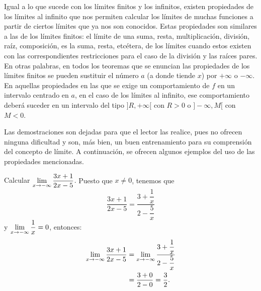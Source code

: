Igual a lo que sucede con los límites finitos y los infinitos, existen propiedades de los límites
al infinito que nos permiten calcular los límites de muchas funciones a partir de ciertos límites
que ya nos son conocidos. Estas propiedades son similares a las de los límites finitos: el límite
de una suma, resta, multiplicación, división, raíz, composición, es la suma, resta, etcétera, de
los límites cuando estos existen con las correspondientes restricciones para el caso de la división
y las raíces pares. En otras palabras, en todos los teoremas que se enuncian las propiedades de los
límites finitos se pueden sustituir el número $a$ (a donde tiende $x$) por $+\infty$ o $-\infty$.
En aquellas propiedades en las que se exige un comportamiento de $f$ en un intervalo centrado en $a$,
en el caso de los límites al infinito, ese comportamiento deberá suceder en un intervalo del tipo
$]R,+\infty[$ con $R > 0$ o $]-\infty,M[$ con $M < 0$.

Las demostraciones son dejadas para que el lector las realice, pues no ofrecen ninguna dificultad y
son, más bien, un buen entrenamiento para su comprensión del concepto de límite. A continuación, se
ofrecen algunos ejemplos del uso de las propiedades mencionadas.

\begin{exemplo}[Solución]{%
Calcular $\displaystyle\limjc{\frac{3x + 1}{2x - 5}}{x}{-\infty}$.
}%
Puesto que $x\neq 0$, tenemos que
\[
\frac{3x + 1}{2x - 5} = \dfrac{3 + \dfrac{1}{x}}{2 - \dfrac{5}{x}}
\]
y $\displaystyle\limjc{\frac{1}{x}}{x}{-\infty} = 0$, entonces:
\begin{align*}
\limjc{\frac{3x + 1}{2x - 5}}{x}{-\infty} &=
\limjc{\dfrac{3 + \dfrac{1}{x}}{2 - \dfrac{5}{x}}}{x}{-\infty} \\
&= \frac{3 + 0}{2 - 0} = \frac{3}{2}.
\end{align*}
\end{exemplo}

